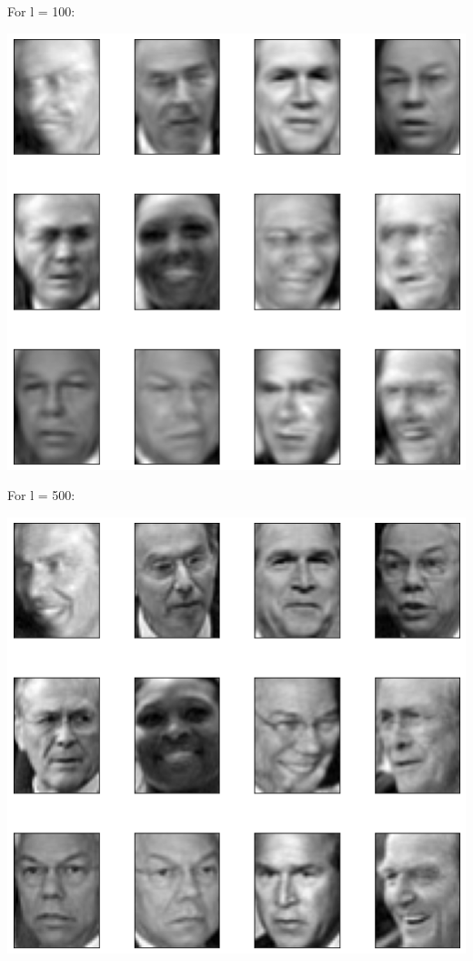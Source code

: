 \documentclass[11pt]{article}
\begin{document}
For l = 100:
\begin{center}
    \includegraphics[scale=0.6]{1c-4.png}
\end{center}

For l = 500:
\begin{center}
    \includegraphics[scale=0.6]{1c-5.png}
\end{center}
\end{document}
